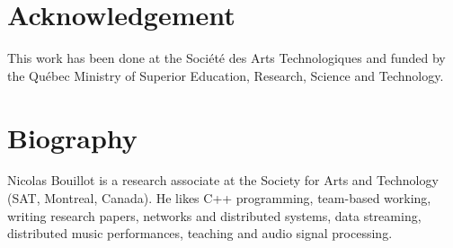 \documentclass{article}
\begin{document}
\section{Acknowledgement}
This work has been done at the Société des Arts Technologiques and funded by the Québec Ministry of Superior Education, Research, Science and Technology.



\section{Biography}
 Nicolas Bouillot is a research associate at the Society for Arts and Technology (SAT, Montreal, Canada). He likes C++ programming, team-based working, writing research papers, networks and distributed systems, data streaming, distributed music performances, teaching and audio signal processing. 
\end{document}
